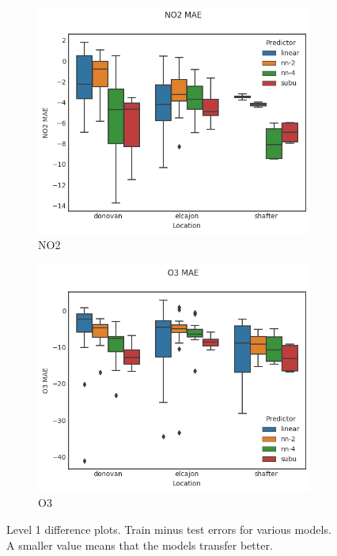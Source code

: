 \documentclass{article}
\begin{document}
\begin{figure}[H]
\centering
\begin{subfigure}{0.45\textwidth}
\includegraphics[width=\textwidth]{results/no2mae_diff.png}
\caption{NO2}
\end{subfigure}
\begin{subfigure}{0.45\textwidth}
\includegraphics[width=\textwidth]{results/o3mae_diff.png}
\caption{O3}
\end{subfigure}
\caption{Level 1 difference plots. Train minus test errors for various models. A smaller value means that the models transfer better.}
\label{fig:generalization}
\end{figure}
\end{document}
